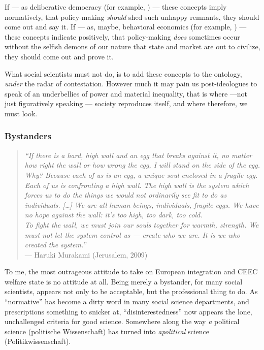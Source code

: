 If --- as deliberative democracy (for example, \citealt{Elster-1998-aa}) --- these concepts imply normatively, that policy-making \emph{should} shed such unhappy remnants, they should come out and say it. If --- as, maybe, behavioral economics (for example, \citealt{Tomasello2009}) --- these concepts indicate positively, that policy-making \emph{does} sometimes occur without the selfish demons of our nature that state and market are out to civilize, they should come out and prove it.

What social scientists must not do, is to add these concepts to the ontology, \emph{under} the radar of contestation. However much it may pain us post-ideologues to speak of \citeauthor{Agnoli-1989-aa}an underbellies of power and material inequality, that is where ---not just figuratively speaking --- society reproduces itself, and where therefore, we must look.

\subsubsection{Bystanders}

\begin{quote}
	\emph{``If there is a hard, high wall and an egg that breaks against it, no matter how right the wall or how wrong the egg, I will stand on the side of the egg. \\
	Why? Because each of us is an egg, a unique soul enclosed in a fragile egg. Each of us is confronting a high wall. The high wall is the system which forces us to do the things we would not ordinarily see fit to do as individuals. [\ldots] We are all human beings, individuals, fragile eggs. We have no hope against the wall: it's too high, too dark, too cold. \\
	To fight the wall, we must join our souls together for warmth, strength. We must not let the system control us --- create who we are. It is we who created the system.''}\\
	--- Haruki Murakami (Jerusalem, 2009)
\end{quote}

To me, the most outrageous attitude to take on European integration and \gls{CEEC} welfare state is no attitude at all. Being merely a bystander, for many social scientists, appears not only to be acceptable, but the professional thing to do. As ``normative'' has become a dirty word in many social science departments, and prescriptions something to snicker at, ``disinterestedness'' now appears the lone, unchallenged criteria for good science. Somewhere along the way \emph{a} political science (politische Wissenschaft) has turned into \emph{apolitical} science (Politikwissenschaft).

